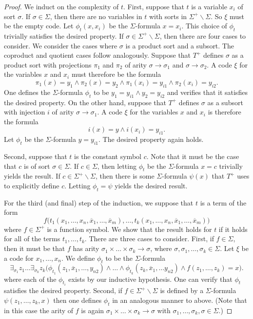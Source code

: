 \begin{proof} We induct on the complexity of $t$. First, suppose that
  $t$ is a variable $x_i$ of sort $\sigma$.  If $\sigma\in\Sigma$,
  then there are no variables in $t$ with sorts in
  $\Sigma^+\backslash\Sigma$. So $\xi$ must be the empty code. Let
  $\phi_t(x, x_i)$ be the $\Sigma$-formula $x=x_i$. This choice of
  $\phi_t$ trivially satisfies the desired property. If
  $\sigma\in\Sigma^+\backslash\Sigma$, then there are four cases to
  consider. We consider the cases where $\sigma$ is a product sort and
  a subsort. The coproduct and quotient cases follow
  analogously. Suppose that $T^+$ defines $\sigma$ as a product sort
  with projections $\pi_1$ and $\pi_2$ of arity
  $\sigma\rightarrow\sigma_1$ and $\sigma\rightarrow\sigma_2$. A code
  $\xi$ for the variables $x$ and $x_i$ must therefore be the formula
\[
  \pi_1(x)=y_1\land\pi_2(x)=y_2\land\pi_1(x_i)=y_{i1}\land\pi_2(x_i)=y_{i2}
  .\] One defines the $\Sigma$-formula $\phi_t$ to be
$y_1=y_{i1}\land y_2=y_{i2}$ and verifies that it satisfies the
desired property. On the other hand, suppose that $T^+$ defines
$\sigma$ as a subsort with injection $i$ of arity
$\sigma\rightarrow\sigma_1$. A code $\xi$ for the variables $x$ and
$x_i$ is therefore the formula \[ i(x)=y\land i(x_i)=y_{i1} .\] Let
$\phi_t$ be the $\Sigma$-formula $y=y_{i1}$. The desired property
again holds.

Second, suppose that $t$ is the constant symbol $c$. Note that it must
be the case that $c$ is of sort $\sigma\in\Sigma$. If $c\in\Sigma$,
then letting $\phi_t$ be the $\Sigma$-formula $x=c$ trivially yields
the result. If $c\in\Sigma^+\backslash\Sigma$, then there is some
$\Sigma$-formula $\psi(x)$ that $T^+$ uses to explicitly define
$c$. Letting $\phi_t=\psi$ yields the desired result.

For the third (and final) step of the induction, we suppose that $t$ is a term of the form
\[ f\big(t_1(x_1,\ldots, x_n, \overline{x}_1,\ldots, \overline{x}_m),
  \ldots, t_k(x_1,\ldots, x_n, \overline{x}_1,\ldots,
  \overline{x}_m)\big) \] where $f\in\Sigma^+$ is a function
symbol. We show that the result holds for $t$ if it holds for all of
the terms $t_1,\ldots, t_k$. There are three cases to consider. First,
if $f\in\Sigma$, then it must be that $f$ has arity
$\sigma_1\times\ldots\times\sigma_k\rightarrow\sigma$, where
$\sigma,\sigma_1,\ldots, \sigma_k\in\Sigma$. Let $\xi$ be a code for
$x_1,\ldots, x_n$. We define $\phi_t$ to be the $\Sigma$-formula
\[ \exists_{\sigma_1}
  z_1\ldots\exists_{\sigma_k}z_k\big(\phi_{t_1}(z_1,
  \overline{x}_1,\ldots, y_{n2})\land\ldots\land\phi_{t_k}(z_k,
  \overline{x}_1,\ldots y_{n2})\land f(z_1,\ldots, z_k)=x\big) .\]
where each of the $\phi_{t_i}$ exists by our inductive hypothesis. One
can verify that $\phi_t$ satisfies the desired property. Second, if
$f\in\Sigma^+\backslash\Sigma$ is defined by a $\Sigma$-formula
$\psi(z_1,\ldots, z_k, x)$ then one defines $\phi_t$ in an analogous
manner to above. (Note that in this case the arity of $f$ is again
$\sigma_1\times\ldots\times\sigma_k\rightarrow \sigma$ with
$\sigma_1,\ldots, \sigma_k,\sigma\in\Sigma$.)


\end{proof}
